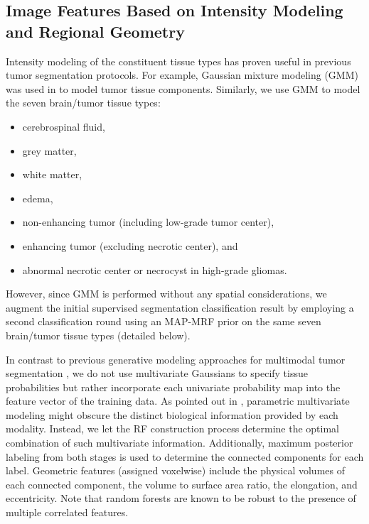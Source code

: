 \subsection{Image Features Based on Intensity Modeling and Regional Geometry}

Intensity modeling of the constituent tissue types has proven
useful in previous tumor segmentation protocols.  For example,
Gaussian mixture modeling (GMM) was used in \citep{bauer2012,zikic2012} to model
tumor tissue components.  Similarly, we use GMM to model 
the seven brain/tumor tissue types:
\begin{itemize}
\item cerebrospinal fluid,
\item grey matter,
\item white matter,
\item edema, 
\item non-enhancing tumor (including low-grade tumor center), 
\item enhancing tumor (excluding necrotic center), and 
\item abnormal necrotic center or necrocyst in high-grade gliomas.
\end{itemize}
However, since GMM is performed without any spatial 
considerations, we augment the initial supervised segmentation 
classification result by employing a second classification round
using an MAP-MRF prior on the same seven brain/tumor tissue types
(detailed below).

In contrast to previous generative
modeling approaches for multimodal tumor segmentation 
\citep[e.g.,][]{prastawa2003}, we do not use multivariate 
Gaussians to specify tissue probabilities but rather incorporate each
univariate probability map into the feature vector of the training
data.  As pointed out in \cite{menze2010}, parametric multivariate modeling
might obscure the distinct biological information provided by each 
modality.  Instead, we let the RF construction 
process determine the optimal combination of such multivariate
information.  Additionally, maximum posterior labeling from both stages
is used to determine the connected components for each label.  
Geometric features (assigned voxelwise) include the physical volumes 
of each connected component, the volume to surface area ratio, 
the elongation, and eccentricity.  Note that random forests are
known to be robust to the presence of multiple correlated features.

